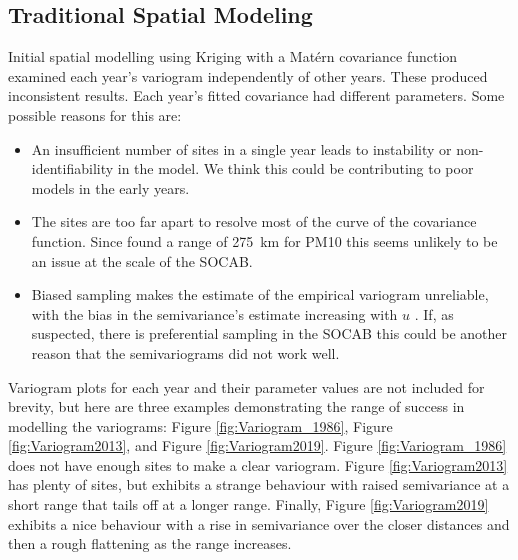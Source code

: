 \subsection{Traditional Spatial Modeling}
\label{subsec:tradspatmod}
Initial spatial modelling using Kriging with a Mat\'{e}rn covariance function examined each year's variogram independently of other years. These produced inconsistent results.  Each year's fitted covariance had different parameters.  Some possible reasons for this are:
\begin{itemize}
\item An insufficient number of sites in a single year leads to instability or non-identifiability in the model.  We think this could be contributing to poor models in the early years.
\item The sites are too far apart to resolve most of the curve of the covariance function. Since \cite{cameletti2011spatio} found a range of 275 km for \ac{PM10} this seems unlikely to be an issue at the scale of the \ac{SOCAB}.
\item Biased sampling makes the estimate of the empirical variogram unreliable, with the bias in the semivariance's estimate increasing with $u$ \citep{diggle:07}.  If, as suspected, there is preferential sampling in the \ac{SOCAB} this could be another reason that the semivariograms did not work well.
\end{itemize}

Variogram plots for each year and their parameter values are not 
included for brevity, 
but here are three examples demonstrating the range of success in modelling the variograms: Figure \ref{fig:Variogram_1986}, Figure \ref{fig:Variogram2013}, and Figure \ref{fig:Variogram2019}.  Figure  \ref{fig:Variogram_1986} does not have enough sites to make a clear variogram.  Figure  \ref{fig:Variogram2013} has plenty of sites, but exhibits a strange behaviour with raised semivariance at a short range that tails off at a longer range.  Finally, Figure  \ref{fig:Variogram2019} exhibits a nice behaviour with a rise in semivariance over the closer distances and then a rough flattening as the range increases.  

